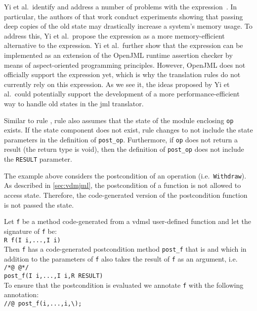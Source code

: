 Yi et al.\ identify and address a number of problems with the \old
expression~\cite{Yi&2013}. In particular, the authors of that work
conduct experiments showing that passing deep copies of the old state
may drastically increase a system's memory usage. To address this, Yi
et al.\ propose the \past expression as a more memory-efficient
alternative to the \old expression. Yi et al.\ further show that the
\past expression can be implemented as an extension of the OpenJML
runtime assertion checker by means of aspect-oriented programming
principles. However, OpenJML does not officially support the \past
expression yet, which is why the translation rules do not currently
rely on this expression. As we see it, the ideas proposed by Yi et
al.\ could potentially support the development of a more
performance-efficient way to handle old states in the \ac{jml}
translator.

Similar to rule , rule  also assumes that
the state of the module enclosing \texttt{op} exists. If the state
component does not exist, rule  changes to not include
the state parameters in the definition of
\texttt{post\_op}. Furthermore, if \texttt{op} does not return a
result (the return type is void), then the definition of
\texttt{post\_op} does not include the \texttt{RESULT} parameter.

The example above considers the postcondition of an operation (i.e.\
\texttt{Withdraw}). As described in \autoref{sec:vdmjml}, the
postcondition of a function is not allowed to access state. Therefore, the
code-generated version of the postcondition function is not
passed the state.

 {
  Let \texttt{f} be a method code-generated from a \ac{vdmsl} user-defined function and let the signature of \texttt{f} be:\\
  \kw{static} \texttt{R f(I\sub{1} i\sub{1},...,I\sub{n} i\sub{n})}\\
  Then \texttt{f} has a code-generated postcondition method \texttt{post\_f} that is  and which in addition to the
  parameters of \texttt{f} also takes the result of \texttt{f} as an argument, i.e.\ \\
  \texttt{/*@ \kw{pure} @*/} \kw{static} \texttt{ \kw{boolean}\\
    post\_f(I i\sub{1},...,I i\sub{n},R RESULT)}\\
  To ensure that the postcondition is evaluated we annotate \texttt{f} with the following  annotation:\\
  \texttt{//@ \kw{ensures}
    post\_f(i,...,i,\textbackslash{});}}

